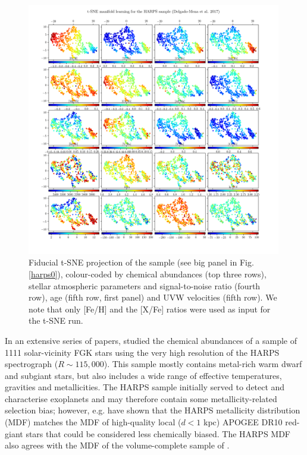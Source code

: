 \documentclass{aa}  %
\begin{document}
\begin{figure}\centering
 \includegraphics[width=0.99\textwidth]{im/HARPS_tsne_plots_withteffcut40_rand0.png}
\caption{Fiducial t-SNE projection of the \citet{DelgadoMena2017} sample (see big panel in Fig. \ref{harps0}), colour-coded by chemical abundances (top three rows), stellar atmospheric parameters and signal-to-noise ratio (fourth row), age (fifth row, first panel) and UVW velocities (fifth row). We note that only [Fe/H] and the [X/Fe] ratios were used as input for the t-SNE run.}
\label{harps1}
\end{figure}

In an extensive series of papers, \citet{Adibekyan2011, Adibekyan2012, DelgadoMena2014, DelgadoMena2015, BertrandeLis2015, Suarez-Andres2017, DelgadoMena2017, DelgadoMena2018} studied the chemical abundances of a sample of 1111 solar-vicinity FGK stars using the very high resolution of the HARPS spectrograph ($R\sim 115,000$). This sample mostly contains metal-rich warm dwarf and subgiant stars, but also includes a wide range of effective temperatures, gravities and metallicities. The HARPS sample initially served to detect and characterise exoplanets and may therefore contain some metallicity-related selection bias; however, e.g. \citet{Anders2014} have shown that the HARPS metallicity distribution (MDF) matches the MDF of high-quality local ($d<1$ kpc) APOGEE DR10 red-giant stars that could be considered less chemically biased. The HARPS MDF also agrees with the MDF of the volume-complete sample of \citet{Fuhrmann2011}.
\end{document}
